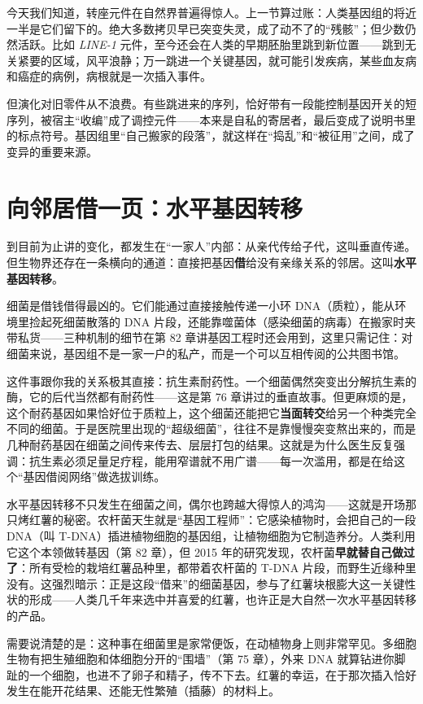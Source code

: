 今天我们知道，转座元件在自然界普遍得惊人。上一节算过账：人类基因组的将近一半是它们留下的。绝大多数拷贝早已突变失灵，成了动不了的“残骸”；但少数仍然活跃。比如 \emph{LINE-1} 元件，至今还会在人类的早期胚胎里跳到新位置——跳到无关紧要的区域，风平浪静；万一跳进一个关键基因，就可能引发疾病，某些血友病和癌症的病例，病根就是一次插入事件。

但演化对旧零件从不浪费。有些跳进来的序列，恰好带有一段能控制基因开关的短序列，被宿主“收编”成了调控元件——本来是自私的寄居者，最后变成了说明书里的标点符号。基因组里“自己搬家的段落”，就这样在“捣乱”和“被征用”之间，成了变异的重要来源。

\section{向邻居借一页：水平基因转移}

到目前为止讲的变化，都发生在“一家人”内部：从亲代传给子代，这叫垂直传递。但生物界还存在一条横向的通道：直接把基因\textbf{借}给没有亲缘关系的邻居。这叫\textbf{水平基因转移}。

细菌是借钱借得最凶的。它们能通过直接接触传递一小环 DNA（质粒），能从环境里捡起死细菌散落的 DNA 片段，还能靠噬菌体（感染细菌的病毒）在搬家时夹带私货——三种机制的细节在第 82 章讲基因工程时还会用到，这里只需记住：对细菌来说，基因组不是一家一户的私产，而是一个可以互相传阅的公共图书馆。

这件事跟你我的关系极其直接：抗生素耐药性。一个细菌偶然突变出分解抗生素的酶，它的后代当然都有耐药性——这是第 76 章讲过的垂直故事。但更麻烦的是，这个耐药基因如果恰好位于质粒上，这个细菌还能把它\textbf{当面转交}给另一个种类完全不同的细菌。于是医院里出现的“超级细菌”，往往不是靠慢慢突变熬出来的，而是几种耐药基因在细菌之间传来传去、层层打包的结果。这就是为什么医生反复强调：抗生素必须足量足疗程，能用窄谱就不用广谱——每一次滥用，都是在给这个“基因借阅网络”做选拔训练。

水平基因转移不只发生在细菌之间，偶尔也跨越大得惊人的鸿沟——这就是开场那只烤红薯的秘密。农杆菌天生就是“基因工程师”：它感染植物时，会把自己的一段 DNA（叫 T-DNA）插进植物细胞的基因组，让植物细胞为它制造养分。人类利用它这个本领做转基因（第 82 章），但 2015 年的研究发现，农杆菌\textbf{早就替自己做过了}：所有受检的栽培红薯品种里，都带着农杆菌的 T-DNA 片段，而野生近缘种里没有。这强烈暗示：正是这段“借来”的细菌基因，参与了红薯块根膨大这一关键性状的形成——人类几千年来选中并喜爱的红薯，也许正是大自然一次水平基因转移的产品。

需要说清楚的是：这种事在细菌里是家常便饭，在动植物身上则非常罕见。多细胞生物有把生殖细胞和体细胞分开的“围墙”（第 75 章），外来 DNA 就算钻进你脚趾的一个细胞，也进不了卵子和精子，传不下去。红薯的幸运，在于那次插入恰好发生在能开花结果、还能无性繁殖（插藤）的材料上。

